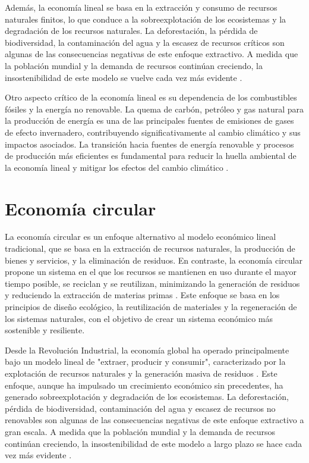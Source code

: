 \documentclass[main.tex]{subfiles}
\begin{document}
Además, la economía lineal se basa en la extracción y consumo de recursos naturales finitos, lo que conduce a la sobreexplotación de los ecosistemas y la degradación de los recursos naturales. La deforestación, la pérdida de biodiversidad, la contaminación del agua y la escasez de recursos críticos son algunas de las consecuencias negativas de este enfoque extractivo. A medida que la población mundial y la demanda de recursos continúan creciendo, la insostenibilidad de este modelo se vuelve cada vez más evidente \cite{clima2022book}.

Otro aspecto crítico de la economía lineal es su dependencia de los combustibles fósiles y la energía no renovable. La quema de carbón, petróleo y gas natural para la producción de energía es una de las principales fuentes de emisiones de gases de efecto invernadero, contribuyendo significativamente al cambio climático y sus impactos asociados. La transición hacia fuentes de energía renovable y procesos de producción más eficientes es fundamental para reducir la huella ambiental de la economía lineal y mitigar los efectos del cambio climático \cite{clima2022book, onu2024ods}.

\section{Economía circular}

La economía circular es un enfoque alternativo al modelo económico lineal tradicional, que se basa en la extracción de recursos naturales, la producción de bienes y servicios, y la eliminación de residuos. En contraste, la economía circular propone un sistema en el que los recursos se mantienen en uso durante el mayor tiempo posible, se reciclan y se reutilizan, minimizando la generación de residuos y reduciendo la extracción de materias primas \cite{ellenmacarthurfoundation2022}. Este enfoque se basa en los principios de diseño ecológico, la reutilización de materiales y la regeneración de los sistemas naturales, con el objetivo de crear un sistema económico más sostenible y resiliente.

Desde la Revolución Industrial, la economía global ha operado principalmente bajo un modelo lineal de "extraer, producir y consumir", caracterizado por la explotación de recursos naturales y la generación masiva de residuos \cite{cerda2016economia}. Este enfoque, aunque ha impulsado un crecimiento económico sin precedentes, ha generado sobreexplotación y degradación de los ecosistemas. La deforestación, pérdida de biodiversidad, contaminación del agua y escasez de recursos no renovables son algunas de las consecuencias negativas de este enfoque extractivo a gran escala. A medida que la población mundial y la demanda de recursos continúan creciendo, la insostenibilidad de este modelo a largo plazo se hace cada vez más evidente \cite{clima2022book}.
\end{document}
